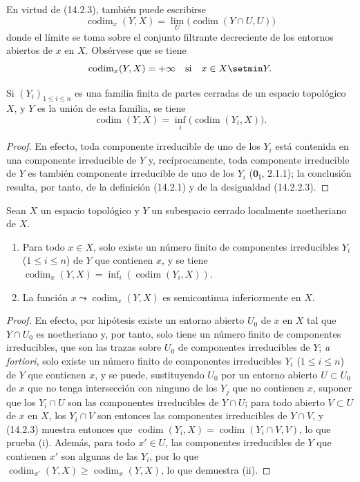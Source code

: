 En virtud de (14.2.3), también puede escribirse
\[
  \operatorname{codim}_x(Y,X)=
  \lim_U\bigl(\operatorname{codim}(Y\cap U,U)\bigr)
  \tag{14.2.4.1}\label{0.14.2.4.1-es}
\]
donde el límite se toma sobre el conjunto filtrante decreciente de los
entornos abiertos de $x$ en $X$. Obsérvese que se tiene
\[
  \operatorname{codim}_x(Y,X)=+\infty\quad\text{si}\quad x\in X\setmin Y.
\]

\begin{proposition}[14.2.5]
\label{0.14.2.5-es}
Si $(Y_i)_{1\leq i\leq n}$ es una familia finita de partes cerradas de un
espacio topológico $X$, y $Y$ es la unión de esta familia, se tiene
\[
  \operatorname{codim}(Y,X)=
  \inf_i\bigl(\operatorname{codim}(Y_i,X)\bigr).
  \tag{14.2.5.1}\label{0.14.2.5.1-es}
\]
\end{proposition}

\begin{proof}
En efecto, toda componente irreducible de uno de los $Y_i$ está contenida en
una componente irreducible de $Y$ y, recíprocamente, toda componente
irreducible de $Y$ es también componente irreducible de uno de los $Y_i$
($\mathbf{0}_{\mathrm I}$, 2.1.1); la conclusión resulta, por tanto, de la definición
(14.2.1) y de la desigualdad (14.2.2.3).
\end{proof}

\begin{corollary}[14.2.6]
\label{0.14.2.6-es}
Sean $X$ un espacio topológico y $Y$ un subespacio cerrado localmente
noetheriano de $X$.
\begin{enumerate}
  \item[\rm(i)] Para todo $x\in X$, solo existe un número finito de
  componentes irreducibles $Y_i$ \textup{($1\leq i\leq n$)} de $Y$ que contienen $x$,
  y se tiene
  $\operatorname{codim}_x(Y,X)=
  \inf_i(\operatorname{codim}(Y_i,X))$.
  \item[\rm(ii)] La función
  $x\leadsto\operatorname{codim}_x(Y,X)$ es semicontinua inferiormente en $X$.
\end{enumerate}
\end{corollary}

\begin{proof}
En efecto, por hipótesis existe un entorno abierto $U_0$ de $x$ en $X$ tal
que $Y\cap U_0$ es noetheriano y, por tanto, solo tiene un número finito de
componentes irreducibles, que son las trazas sobre $U_0$ de componentes
irreducibles de $Y$; \emph{a fortiori}, solo existe un número finito de
componentes irreducibles $Y_i$ ($1\leq i\leq n$) de $Y$ que contienen $x$, y
se puede, sustituyendo $U_0$ por un entorno abierto $U\subset U_0$ de $x$ que
no tenga intersección con ninguno de los $Y_j$ que no contienen $x$, suponer
que los $Y_i\cap U$ son las componentes irreducibles de $Y\cap U$; para todo
abierto $V\subset U$ de $x$ en $X$, los $Y_i\cap V$ son entonces las
componentes irreducibles de $Y\cap V$, y (14.2.3) muestra entonces que
$\operatorname{codim}(Y_i,X)=\operatorname{codim}(Y_i\cap V,V)$, lo que
prueba (i). Además, para todo $x'\in U$, las componentes irreducibles de $Y$
que contienen $x'$ son algunas de las $Y_i$, por lo que
$\operatorname{codim}_{x'}(Y,X)\geq\operatorname{codim}_x(Y,X)$, lo que
demuestra (ii).
\end{proof}

